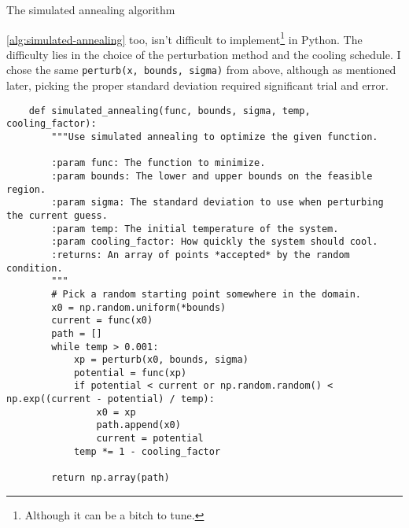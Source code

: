 \documentclass{article}
\begin{document}
\begin{algorithm}[H]
    \begin{algorithmic}
                \EndIf{}
            \EndWhile{}
            \State{}
        \EndFunction{}
    \end{algorithmic}
    \caption{The simulated annealing algorithm}\label{alg:simulated-annealing}
\end{algorithm}

\autoref{alg:simulated-annealing} too, isn't difficult to implement\footnote{Although it can be a
    bitch to tune.} in Python. The difficulty lies in the choice of the perturbation method and the
cooling schedule. I chose the same \texttt{perturb(x, bounds, sigma)} from above,
although as mentioned later, picking the proper standard deviation required significant trial and
error.

\begin{verbatim}
    def simulated_annealing(func, bounds, sigma, temp, cooling_factor):
        """Use simulated annealing to optimize the given function.

        :param func: The function to minimize.
        :param bounds: The lower and upper bounds on the feasible region.
        :param sigma: The standard deviation to use when perturbing the current guess.
        :param temp: The initial temperature of the system.
        :param cooling_factor: How quickly the system should cool.
        :returns: An array of points *accepted* by the random condition.
        """
        # Pick a random starting point somewhere in the domain.
        x0 = np.random.uniform(*bounds)
        current = func(x0)
        path = []
        while temp > 0.001:
            xp = perturb(x0, bounds, sigma)
            potential = func(xp)
            if potential < current or np.random.random() < np.exp((current - potential) / temp):
                x0 = xp
                path.append(x0)
                current = potential
            temp *= 1 - cooling_factor

        return np.array(path)
\end{verbatim}
\end{document}
